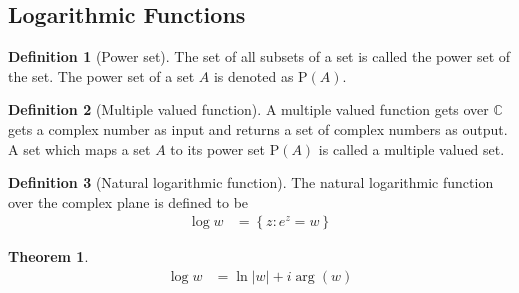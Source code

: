 \documentclass[titlepage, fleqn, a4paper, 12pt, twoside]{article}
\theoremstyle{definition}
\newtheorem{definition}{Definition}
\theoremstyle{theorem}
\newtheorem{theorem}{Theorem}
\begin{document}
\subsection{Logarithmic Functions}

\begin{definition}[Power set]
	The set of all subsets of a set is called the power set of the set.
	The power set of a set $A$ is denoted as $\mathrm{P}(A)$.
\end{definition}

\begin{definition}[Multiple valued function]
	\marginnote
	{
		A multiple valued function gets over $\mathbb{C}$ gets a complex number as input and returns a set of complex numbers as output.
	}
	A set which maps a set $A$ to its power set $\mathrm{P}(A)$ is called a multiple valued set.
\end{definition}

\begin{definition}[Natural logarithmic function]
	The natural logarithmic function over the complex plane is defined to be
	\begin{align*}
		\log w & = \left\{ z : e^z = w \right\}
	\end{align*}
\end{definition}

\begin{theorem}
	\begin{align*}
		\log w & = \ln |w| + i \arg(w)
	\end{align*}
\end{theorem}
\end{document}
